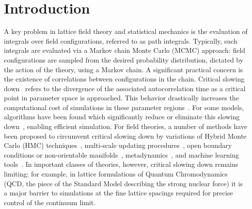 \section{Introduction}
\label{sec:intro}

%
A key problem in lattice field theory and statistical mechanics is the evaluation of integrals over field configurations, referred to as path integrals. Typically, such integrals are evaluated via a Markov chain Monte Carlo (MCMC) approach: field configurations are sampled from the desired probability distribution, dictated by the action of the theory, using a Markov chain.
%
A significant practical concern is the existence of correlations between configurations in the chain. Critical slowing down~\cite{Wolff:1989wq} refers to the divergence of the associated autocorrelation time as a critical point in parameter space is approached. This behavior drastically increases the computational cost of simulations in these parameter regions~\cite{DelDebbio:2004xh,Meyer:2006ty}. For some models, algorithms have been found which significantly reduce or eliminate this slowing down~\cite{Kandel:1988zz,Bonati:2017woi,PhysRevD.98.054502,SwendsenWang87,Wolff1989,ProkofevSvistunov01,KawashimaHarada04,Bietenholz1995MeronCluster}, enabling efficient simulation. For field theories, a number of methods have been proposed to circumvent critical slowing down by variations of Hybrid Monte Carlo (HMC) techniques~\cite{Ramos:2012bb,Gambhir:2015rha,Cossu:2017eys,Jin2019QNHMC}, multi-scale updating procedures~\cite{Endres:2015yca,Detmold:2016rnh,Detmold:2018zgk}, open boundary conditions or non-orientable manifolds~\cite{Luscher:2012av,Mages:2015scv,Burnier:2017osu}, metadynamics~\cite{Laio:2015era}, and machine learning tools~\cite{Tanaka:2017niz,Shanahan:2018vcv}. In important classes of theories, however, critical slowing down remains limiting; for example, in lattice formulations of Quantum Chromodynamics (QCD, the piece of the Standard Model describing the strong nuclear force) it is a major barrier to simulations at the fine lattice spacings required for precise control of the continuum limit.


